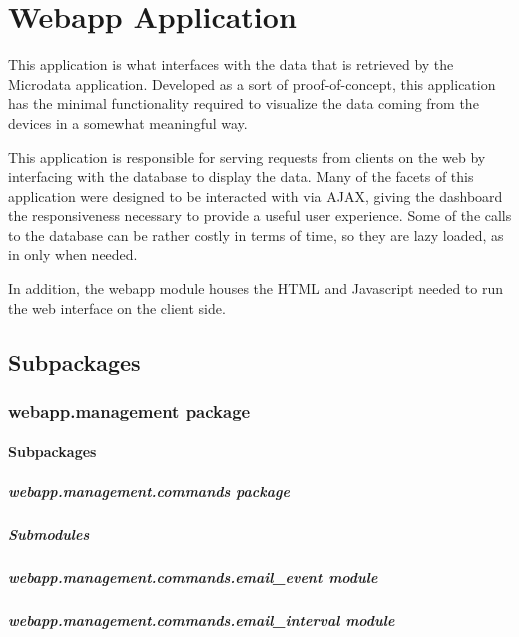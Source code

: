 \documentclass[letterpaper,10pt,english]{sphinxmanual}
\begin{document}
\section{Webapp Application}
\label{modules/webapp:webapp-application}\label{modules/webapp::doc}
This application is what interfaces with the data that is retrieved by the Microdata application. Developed as a sort of proof-of-concept, this application has the minimal functionality required to visualize the data coming from the devices in a somewhat meaningful way.

This application is responsible for serving requests from clients on the web by interfacing with the database to display the data. Many of the facets of this application were designed to be interacted with via AJAX, giving the dashboard the responsiveness necessary to provide a useful user experience. Some of the calls to the database can be rather costly in terms of time, so they are lazy loaded, as in only when needed.

In addition, the webapp module houses the HTML and Javascript needed to run the web interface on the client side.


\subsection{Subpackages}
\label{modules/webapp:subpackages}

\subsubsection{webapp.management package}
\label{modules/webapp.management::doc}\label{modules/webapp.management:webapp-management-package}

\paragraph{Subpackages}
\label{modules/webapp.management:subpackages}

\subparagraph{webapp.management.commands package}
\label{modules/webapp.management.commands::doc}\label{modules/webapp.management.commands:webapp-management-commands-package}

\subparagraph{Submodules}
\label{modules/webapp.management.commands:submodules}

\subparagraph{webapp.management.commands.email\_event module}
\label{modules/webapp.management.commands:webapp-management-commands-email-event-module}

\subparagraph{webapp.management.commands.email\_interval module}
\label{modules/webapp.management.commands:webapp-management-commands-email-interval-module}
\end{document}
